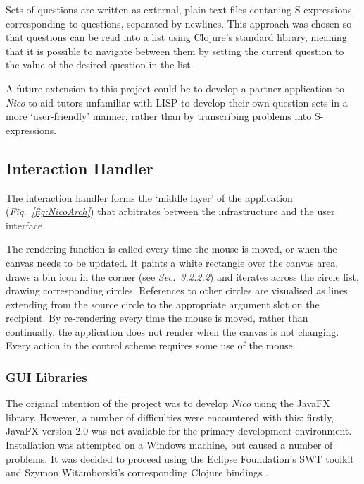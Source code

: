 \documentclass[12pt,twoside,notitlepage,xetex]{report}
\begin{document}
Sets of questions are written as external, plain-text files contaning S-expressions corresponding to questions, separated by newlines.  This approach was chosen so that questions can be read into a list using Clojure's standard library, meaning that it is possible to navigate between them by setting the current question to the value of the desired question in the list.

A future extension to this project could be to develop a partner application to \emph{Nico} to aid tutors unfamiliar with LISP to develop their own question sets in a more `user-friendly' manner, rather than by transcribing problems into S-expressions.

\subsection{Interaction Handler}
%

The interaction handler forms the `middle layer' of the application (\emph{Fig.~\ref{fig:NicoArch}}) that arbitrates between the infrastructure and the user interface.

The rendering function is called every time the mouse is moved, or when the canvas needs to be updated.  It paints a white rectangle over the canvas area, draws a bin icon in the corner (see \emph{Sec.~3.2.2.2}) and iterates across the circle list, drawing corresponding circles.  References to other circles are visualised as lines extending from the source circle to the appropriate argument slot on the recipient.  By re-rendering every time the mouse is moved, rather than continually, the application does not render when the canvas is not changing.  Every action in the control scheme requires some use of the mouse.

\subsubsection{GUI Libraries}

The original intention of the project was to develop \emph{Nico} using the JavaFX library. However, a number of difficulties were encountered with this: firstly, JavaFX version 2.0 was not available for the primary development environment.  Installation was attempted on a Windows machine, but caused a number of problems. It was decided to proceed using the Eclipse Foundation's SWT toolkit and Szymon Witamborski's corresponding Clojure bindings \cite{GuiFtw}.
\end{document}
